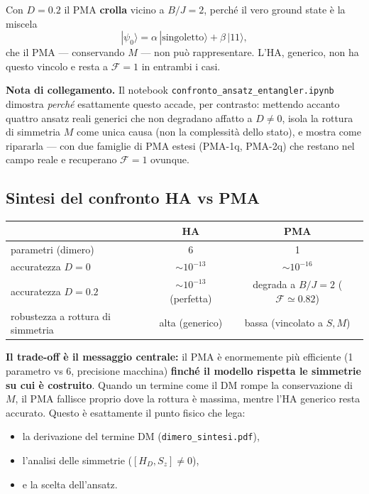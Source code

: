 \documentclass[11pt,a4paper]{article}
\begin{document}
Con $D=0.2$ il PMA \textbf{crolla} vicino a $B/J=2$, perché il vero
ground state è la miscela
$$|\psi_0\rangle = \alpha\,|\text{singoletto}\rangle + \beta\,|11\rangle,$$
che il PMA --- conservando $M$ --- non può rappresentare. L'HA,
generico, non ha questo vincolo e resta a $\mathcal F=1$ in entrambi i
casi.

\begin{keyeq}
\textbf{Nota di collegamento.} Il notebook
\texttt{confronto\_ansatz\_entangler.ipynb} dimostra \emph{perché}
esattamente questo accade, per contrasto: mettendo accanto quattro
ansatz reali generici che non degradano affatto a $D\neq0$, isola la
rottura di simmetria $M$ come unica causa (non la complessità dello
stato), e mostra come ripararla --- con due famiglie di PMA estesi
(PMA-1q, PMA-2q) che restano nel campo reale e recuperano
$\mathcal F=1$ ovunque.
\end{keyeq}

\subsection*{Sintesi del confronto HA vs PMA}

\begin{center}
\renewcommand{\arraystretch}{1.3}
\begin{tabular}{@{}lcc@{}}
\toprule
\rowcolor{inkblue!10}
 & \textbf{HA} & \textbf{PMA}\\
\midrule
parametri (dimero) & 6 & 1\\
accuratezza $D=0$ & $\sim10^{-13}$ & $\sim10^{-16}$\\
accuratezza $D=0.2$ & $\sim10^{-13}$ (perfetta) & degrada a $B/J{=}2$ ($\mathcal F\simeq0.82$)\\
robustezza a rottura di simmetria & alta (generico) & bassa (vincolato a $S,M$)\\
\bottomrule
\end{tabular}
\end{center}

\textbf{Il trade-off è il messaggio centrale:} il PMA è enormemente più
efficiente (1 parametro vs 6, precisione macchina) \textbf{finché il
modello rispetta le simmetrie su cui è costruito}. Quando un termine
come il DM rompe la conservazione di $M$, il PMA fallisce proprio dove
la rottura è massima, mentre l'HA generico resta accurato. Questo è
esattamente il punto fisico che lega:
\begin{itemize}[leftmargin=1.3em,itemsep=0.1em]
\item la derivazione del termine DM (\texttt{dimero\_sintesi.pdf}),
\item l'analisi delle simmetrie ($[H_D,S_z]\neq0$),
\item e la scelta dell'ansatz.
\end{itemize}
\end{document}
